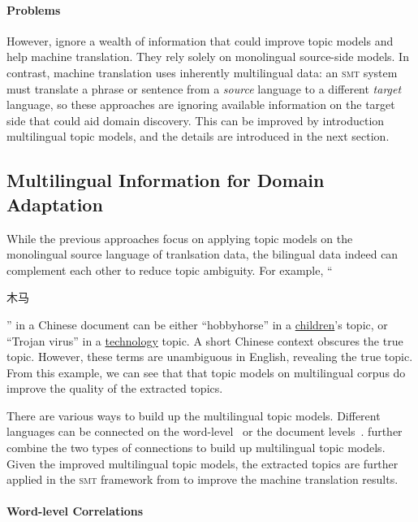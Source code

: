 \paragraph{Problems}

However, \citet{Eidelman-12,hasler-12,su-12} ignore a wealth of
information that could improve topic models and help machine
translation. They rely solely on monolingual source-side models. In
contrast, machine translation uses inherently multilingual data: an
\textsc{smt} system must translate a phrase or sentence from a
\emph{source} language to a different \emph{target} language, so these
approaches are ignoring available information on the target side that
could aid domain discovery. This can be improved by introduction
multilingual topic models, and the details are introduced in the next
section.

\subsection{Multilingual Information for Domain Adaptation}
\label{sec:trans-multiling}

While the previous approaches focus on applying topic models on the
monolingual source language of tranlsation data, the bilingual data
indeed can complement each other to reduce topic ambiguity.  For
example, ``\begin{CJK*}{UTF8}{gbsn}木马\end{CJK*}'' in a Chinese
  document can be either ``hobbyhorse'' in a \underline{children}'s
  topic, or ``Trojan virus'' in a \underline{technology} topic.  A
  short Chinese context obscures the true topic. However, these terms
  are unambiguous in English, revealing the true topic. From this
  example, we can see that that topic models on multilingual corpus do
  improve the quality of the extracted topics.

There are various ways to build up the multilingual topic
models. Different languages can be connected on the
word-level~\citep{boyd-graber-07,andrzejewski-09,hu-14:itm} or the
document levels~\citep{mimno-09}. \citet{hu-14} further combine the
two types of connections to build up multilingual topic models. Given
the improved multilingual topic models, the extracted topics are
further applied in the \textsc{smt} framework from \citet{Eidelman-12}
to improve the machine translation results.

\paragraph{\bf Word-level Correlations}

